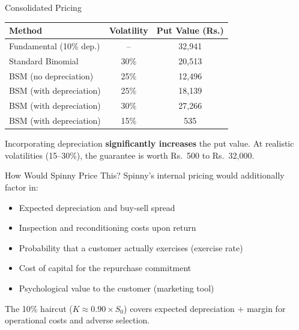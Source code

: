 \documentclass[11pt, aspectratio=43]{beamer}
\begin{document}
\begin{frame}{Consolidated Pricing}
    \begin{table}
        \centering
        \small
        \begin{tabular}{@{}lcc@{}}
            \toprule
            \textbf{Method} & \textbf{Volatility} & \textbf{Put Value (Rs.)} \\
            \midrule
            Fundamental (10\% dep.) & -- & 32,941 \\
            Standard Binomial & 30\% & 20,513 \\
            BSM (no depreciation) & 25\% & 12,496 \\
            BSM (with depreciation) & 25\% & 18,139 \\
            BSM (with depreciation) & 30\% & 27,266 \\
            BSM (with depreciation) & 15\% & 535 \\
            \bottomrule
        \end{tabular}
    \end{table}

    \vspace{0.5em}
    Incorporating depreciation \textbf{significantly increases} the put value. At realistic volatilities (15--30\%), the guarantee is worth Rs.~500 to Rs.~32,000.
\end{frame}


\begin{frame}{How Would Spinny Price This?}
    Spinny's internal pricing would additionally factor in:

    \vspace{0.5em}
    \begin{itemize}
        \item Expected depreciation and buy-sell spread
        \item Inspection and reconditioning costs upon return
        \item Probability that a customer actually exercises (exercise rate)
        \item Cost of capital for the repurchase commitment
        \item Psychological value to the customer (marketing tool)
    \end{itemize}

    \vspace{0.8em}
    The 10\% haircut ($K \approx 0.90 \times S_0$) covers expected depreciation $+$ margin for operational costs and adverse selection.
\end{frame}
\end{document}

